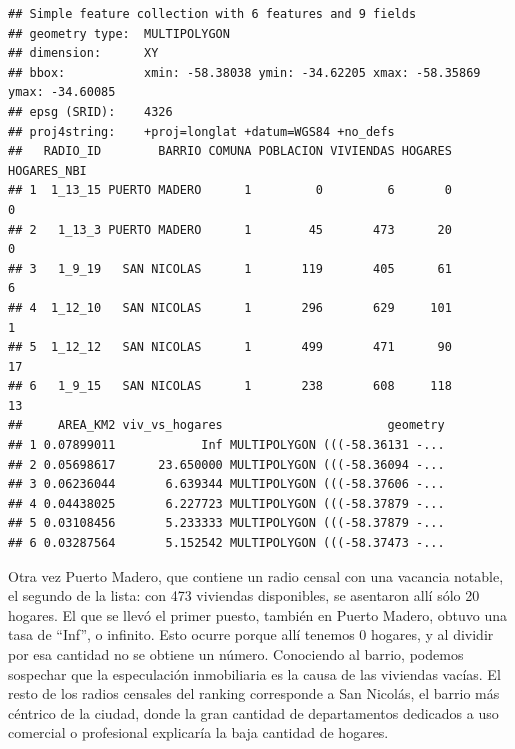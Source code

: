 \documentclass[spanish,]{book}
\newenvironment{Shaded}{\begin{snugshade}}{\end{snugshade}}
\newcommand{\DataTypeTok}[1]{\textcolor[rgb]{0.13,0.29,0.53}{#1}}
\newcommand{\KeywordTok}[1]{\textcolor[rgb]{0.13,0.29,0.53}{\textbf{#1}}}
\newcommand{\NormalTok}[1]{#1}
\newcommand{\OperatorTok}[1]{\textcolor[rgb]{0.81,0.36,0.00}{\textbf{#1}}}
\newcommand{\StringTok}[1]{\textcolor[rgb]{0.31,0.60,0.02}{#1}}
\begin{document}
\begin{Shaded}
\end{Shaded}

\begin{verbatim}
## Simple feature collection with 6 features and 9 fields
## geometry type:  MULTIPOLYGON
## dimension:      XY
## bbox:           xmin: -58.38038 ymin: -34.62205 xmax: -58.35869 ymax: -34.60085
## epsg (SRID):    4326
## proj4string:    +proj=longlat +datum=WGS84 +no_defs
##   RADIO_ID        BARRIO COMUNA POBLACION VIVIENDAS HOGARES HOGARES_NBI
## 1  1_13_15 PUERTO MADERO      1         0         6       0           0
## 2   1_13_3 PUERTO MADERO      1        45       473      20           0
## 3   1_9_19   SAN NICOLAS      1       119       405      61           6
## 4  1_12_10   SAN NICOLAS      1       296       629     101           1
## 5  1_12_12   SAN NICOLAS      1       499       471      90          17
## 6   1_9_15   SAN NICOLAS      1       238       608     118          13
##     AREA_KM2 viv_vs_hogares                       geometry
## 1 0.07899011            Inf MULTIPOLYGON (((-58.36131 -...
## 2 0.05698617      23.650000 MULTIPOLYGON (((-58.36094 -...
## 3 0.06236044       6.639344 MULTIPOLYGON (((-58.37606 -...
## 4 0.04438025       6.227723 MULTIPOLYGON (((-58.37879 -...
## 5 0.03108456       5.233333 MULTIPOLYGON (((-58.37879 -...
## 6 0.03287564       5.152542 MULTIPOLYGON (((-58.37473 -...
\end{verbatim}

Otra vez Puerto Madero, que contiene un radio censal con una vacancia notable, el segundo de la lista: con 473 viviendas disponibles, se asentaron allí sólo 20 hogares. El que se llevó el primer puesto, también en Puerto Madero, obtuvo una tasa de ``Inf'', o infinito. Esto ocurre porque allí tenemos 0 hogares, y al dividir por esa cantidad no se obtiene un número. Conociendo al barrio, podemos sospechar que la especulación inmobiliaria es la causa de las viviendas vacías. El resto de los radios censales del ranking corresponde a San Nicolás, el barrio más céntrico de la ciudad, donde la gran cantidad de departamentos dedicados a uso comercial o profesional explicaría la baja cantidad de hogares.
\end{document}
